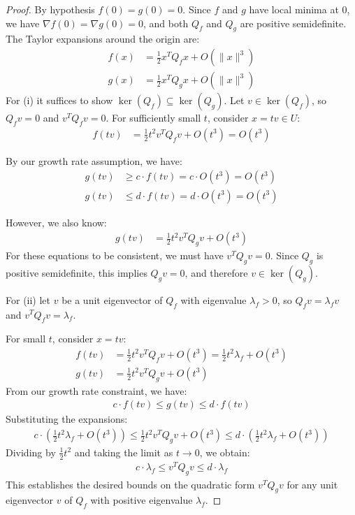\documentclass[10pt,a4paper]{amsart}
\begin{document}
\begin{proof}
By hypothesis $f(0) = g(0) = 0$. Since $f$ and $g$ have local minima at $0$, we have $\nabla f(0) = \nabla g(0) = 0$, and both $Q_f$ and $Q_g$ are positive semidefinite. The Taylor expansions around the origin are:
\begin{align}
f(x) &= \frac{1}{2}x^T Q_f x + O(\|x\|^3)\\
g(x) &= \frac{1}{2}x^T Q_g x + O(\|x\|^3)
\end{align}
For (i) it suffices to show $\ker(Q_f) \subseteq \ker(Q_g)$. Let $v \in \ker(Q_f)$, so $Q_f v = 0$ and $v^T Q_f v = 0$. For sufficiently small $t$, consider $x = tv \in U$:
\begin{align}
f(tv) &= \frac{1}{2}t^2 v^T Q_f v + O(t^3) = O(t^3)
\end{align}

By our growth rate assumption, we have:
\begin{align}
g(tv) &\geq c \cdot f(tv) = c \cdot O(t^3) = O(t^3)\\
g(tv) &\leq d \cdot f(tv) = d \cdot O(t^3) = O(t^3)
\end{align}

However, we also know:
\begin{align}
g(tv) &= \frac{1}{2}t^2 v^T Q_g v + O(t^3)
\end{align}
For these equations to be consistent, we must have $v^T Q_g v = 0$. Since $Q_g$ is positive semidefinite, this implies $Q_g v = 0$, and therefore $v \in \ker(Q_g)$.

For (ii) let $v$ be a unit eigenvector of $Q_f$ with eigenvalue $\lambda_f > 0$, so $Q_f v = \lambda_f v$ and $v^T Q_f v = \lambda_f$.

For small $t$, consider $x = tv$:
\begin{align}
f(tv) &= \frac{1}{2}t^2 v^T Q_f v + O(t^3) = \frac{1}{2}t^2 \lambda_f + O(t^3)\\
g(tv) &= \frac{1}{2}t^2 v^T Q_g v + O(t^3)
\end{align}
From our growth rate constraint, we have:
\begin{align}
c \cdot f(tv) \leq g(tv) \leq d \cdot f(tv)
\end{align}
Substituting the expansions:
\begin{align}
c \cdot \left(\frac{1}{2}t^2 \lambda_f + O(t^3)\right) \leq \frac{1}{2}t^2 v^T Q_g v + O(t^3) \leq d \cdot \left(\frac{1}{2}t^2 \lambda_f + O(t^3)\right)
\end{align}
Dividing by $\frac{1}{2}t^2$ and taking the limit as $t \to 0$, we obtain:
\begin{align}
c \cdot \lambda_f \leq v^T Q_g v \leq d \cdot \lambda_f
\end{align}
This establishes the desired bounds on the quadratic form $v^T Q_g v$ for any unit eigenvector $v$ of $Q_f$ with positive eigenvalue $\lambda_f$.
\end{proof}
\end{document}
